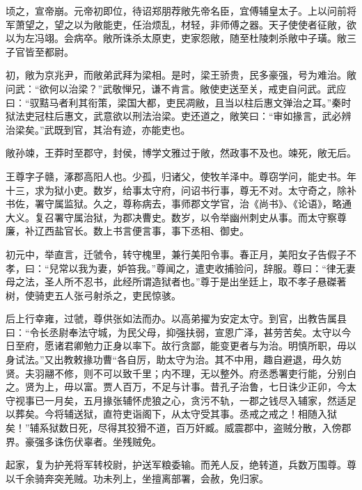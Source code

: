 \documentclass[12pt,UTF8]{ctexbook}
\begin{document}
顷之，宣帝崩。元帝初即位，待诏郑朋荐敞先帝名臣，宜傅辅皇太子。上以问前将军萧望之，望之以为敞能吏，任治烦乱，材轻，非师傅之器。天子使使者征敞，欲以为左冯翊。会病卒。敞所诛杀太原吏，吏家怨敞，随至杜陵刺杀敞中子璜。敞三子官皆至都尉。



初，敞为京兆尹，而敞弟武拜为梁相。是时，梁王骄贵，民多豪强，号为难治。敞问武：“欲何以治梁？”武敬惮兄，谦不肯言。敞使吏送至关，戒吏自问武。武应曰：“驭黠马者利其衔策，梁国大都，吏民凋敝，且当以柱后惠文弹治之耳。”秦时狱法吏冠柱后惠文，武意欲以刑法治梁。吏还道之，敞笑曰：“审如掾言，武必辨治梁矣。”武既到官，其治有迹，亦能吏也。



敞孙竦，王莽时至郡守，封侯，博学文雅过于敞，然政事不及也。竦死，敞无后。



王尊字子赣，涿郡高阳人也。少孤，归诸父，使牧羊泽中。尊窃学问，能史书。年十三，求为狱小吏。数岁，给事太守府，问诏书行事，尊无不对。太守奇之，除补书佐，署守属监狱。久之，尊称病去，事师郡文学官，治《尚书》、《论语》，略通大义。复召署守属治狱，为郡决曹史。数岁，以令举幽州刺史从事。而太守察尊廉，补辽西盐官长。数上书言便言事，事下丞相、御史。



初元中，举直言，迁虢令，转守槐里，兼行美阳令事。春正月，美阳女子告假子不孝，曰：“兒常以我为妻，妒笞我。”尊闻之，遣吏收捕验问，辞服。尊曰：“律无妻母之法，圣人所不忍书，此经所谓造狱者也。”尊于是出坐廷上，取不孝子悬磔著树，使骑吏五人张弓射杀之，吏民惊骇。



后上行幸雍，过虢，尊供张如法而办。以高弟擢为安定太守。到官，出教告属县曰：“令长丞尉奉法守城，为民父母，抑强扶弱，宣恩广泽，甚劳苦矣。太守以今日至府，愿诸君卿勉力正身以率下。故行贪鄙，能变更者与为治。明慎所职，毋以身试法。”又出教敕掾功曹“各自厉，助太守为治。其不中用，趣自避退，毋久妨贤。夫羽翮不修，则不可以致千里；内不理，无以整外。府丞悉署吏行能，分别白之。贤为上，毋以富。贾人百万，不足与计事。昔孔子治鲁，七日诛少正卯，今太守视事已一月矣，五月掾张辅怀虎狼之心，贪污不轨，一郡之钱尽入辅家，然适足以葬矣。今将辅送狱，直符吏诣阁下，从太守受其事。丞戒之戒之！相随入狱矣！”辅系狱数日死，尽得其狡猾不道，百万奸臧。威震郡中，盗贼分散，入傍郡界。豪强多诛伤伏辜者。坐残贼免。



起家，复为护羌将军转校尉，护送军粮委输。而羌人反，绝转道，兵数万围尊。尊以千余骑奔突羌贼。功未列上，坐擅离部署，会赦，免归家。
\end{document}
